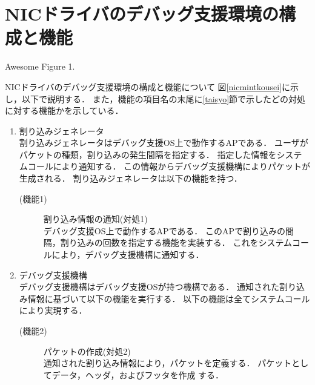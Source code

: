 \documentclass[tanilab-enum]{graduate}
\begin{document}
\section{NICドライバのデバッグ支援環境の構成と機能}
{Awesome Figure 1.}

NICドライバのデバッグ支援環境の構成と機能について
図\ref{nicmintkousei}に示し，以下で説明する．
また，機能の項目名の末尾に\ref{taisyo}節で示したどの対処
に対する機能かを示している．
\begin{enumerate}
    \item 割り込みジェネレータ\\
        割り込みジェネレータはデバッグ支援OS上で動作するAPである．
        ユーザがパケットの種類，割り込みの発生間隔を指定する．
        指定した情報をシステムコールにより通知する．
        この情報からデバッグ支援機構によりパケットが生成される．
        割り込みジェネレータは以下の機能を持つ．
        \begin{description}
            \item[(機能1)]割り込み情報の通知(対処1)\\
                デバッグ支援OS上で動作するAPである．
                このAPで割り込みの間隔，割り込みの回数を指定する機能を実装する．
                これをシステムコールにより，デバッグ支援機構に通知する．
        \end{description}
    \item デバッグ支援機構\\
        デバッグ支援機構はデバッグ支援OSが持つ機構である．
        通知された割り込み情報に基づいて以下の機能を実行する．
        以下の機能は全てシステムコールにより実現する．
        \begin{description}
            \item[(機能2)]パケットの作成(対処2)\\
                通知された割り込み情報により，パケットを定義する．
                パケットとしてデータ，ヘッダ，およびフッタを作成
                する．


\end{description}
\end{enumerate}
\end{document}
